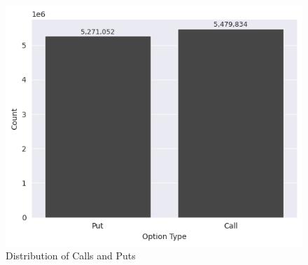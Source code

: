 \documentclass[a4paper]{article}
\begin{document}
\begin{multicols}{2}
  \begin{figure}[H]
    \centering
    \includegraphics[width=\linewidth]{07_opt_type_dist.png}
    \caption{Distribution of Calls and Puts}
    \label{fig:07_opt_type_dist}
  \end{figure}
\end{multicols}
\end{document}
